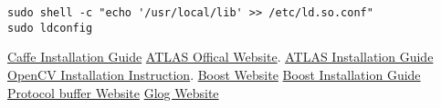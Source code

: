 \documentclass[a4paper, 11pt]{article}
\begin{document}
\begin{lstlisting}
sudo shell -c "echo '/usr/local/lib' >> /etc/ld.so.conf"
sudo ldconfig
\end{lstlisting}




\begin{thebibliography}{9}
 \href{http://caffe.berkeleyvision.org/installation.html}{Caffe Installation Guide}
  \href{http://math-atlas.sourceforge.net}{ATLAS Offical Website}.
  \href{http://math-atlas.sourceforge.net/atlas_install/}{ATLAS Installation Guide}
 \href{http://docs.opencv.org/doc/tutorials/introduction/linux_install/linux_install.html}{OpenCV Installation Instruction}.
 \href{http://www.boost.org}{Boost Website}
 \href{http://www.boost.org/doc/libs/1_57_0/more/getting_started/unix-variants.html#easy-build-and-install}{Boost Installation Guide}
 \href{https://code.google.com/p/protobuf/}{Protocol buffer Website}
 \href{https://code.google.com/p/google-glog/}{Glog Website}
\end{thebibliography}
\end{document}
